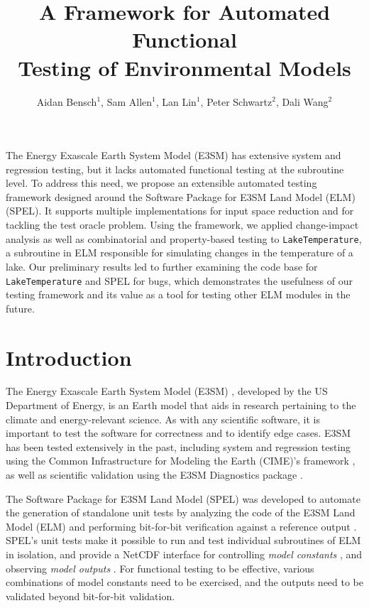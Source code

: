 \documentclass[10pt,twocolumn]{article}
\title{
	A Framework for Automated Functional \\
	Testing of Environmental Models
}
\author{
	Aidan Bensch$^1$, Sam Allen$^1$, Lan Lin$^1$, Peter Schwartz$^2$, Dali Wang$^2$
}
\affiliation{
	\small
	$^1$Department of Computer Science,
	Ball State University,
	Muncie, IN 47306, USA \\
	\small
	\{aidan.bensch, sallen7, llin4\}@bsu.edu \\
	\small
	$^2$Environmental Sciences Division,
	Oak Ridge National Laboratory,
	Oak Ridge, TN 37831, USA \\
	\small
	\{schwartzpd, wangd\}@ornl.gov
}
\newcommand{\term}[1]{%
    \emph{#1}%
}
\begin{document}

\maketitle

\thispagestyle{empty}

\abstract
The Energy Exascale Earth System Model (E3SM) has extensive system and 
regression testing, but it lacks automated functional testing at the subroutine level. To
address this need, we propose an extensible automated testing framework designed around the Software Package for E3SM Land Model (ELM) (SPEL). It supports 
multiple implementations for input space reduction and for tackling the test oracle problem. Using the framework, we applied change-impact analysis as well as combinatorial and 
property-based testing to \verb|LakeTemperature|, a subroutine in ELM responsible for 
simulating changes in the temperature of a lake. Our preliminary results led to further examining the code base for \verb|LakeTemperature| and SPEL for bugs, 
which demonstrates the usefulness of our testing 
framework and its value as a tool for testing other ELM modules in the future.
\endabstract

\section{Introduction}
\label{sec:introduction}

The Energy Exascale Earth System Model (E3SM) \cite{e3sm}, developed by the US 
Department of Energy, is an Earth model that aids in research pertaining to the 
climate and energy-relevant science. As with any scientific software, it is 
important to test the software for correctness and to identify edge cases. E3SM has 
been tested extensively in the past, including system and regression testing using the 
Common Infrastructure for Modeling the Earth (CIME)'s framework \cite{cime}, as 
well as scientific validation using the E3SM Diagnostics package \cite{e3sm-diag}.


The Software Package for E3SM Land Model (SPEL) was developed to automate the generation
of standalone unit tests by analyzing the code of the E3SM Land Model (ELM) and performing 
bit-for-bit verification against a reference output \cite{spel}. SPEL's unit tests make it 
possible to run and test individual subroutines of ELM in isolation, and provide a 
NetCDF \cite{netcdf} interface for controlling \term{model constants},
and observing \term{model outputs}. For functional testing to be 
effective, various combinations of model constants need to be exercised, and 
the outputs need to be validated beyond bit-for-bit validation.
\end{document}
